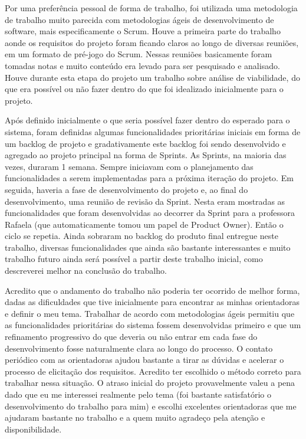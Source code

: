 \documentclass{abnt}
\begin{document}
Por uma preferência pessoal de forma de trabalho, foi utilizada uma metodologia
de trabalho muito parecida com metodologias ágeis de desenvolvimento de software,
mais especificamente o Scrum. Houve a primeira parte do trabalho aonde os requisitos
do projeto foram ficando claros ao longo de diversas reuniões, em um formato de
pré-jogo do Scrum. Nessas reuniões basicamente foram tomadas notas e muito conteúdo
era levado para ser pesquisado e analisado. Houve durante esta etapa do projeto
um trabalho sobre análise de viabilidade, do que era possível ou não fazer dentro
do que foi idealizado inicialmente para o projeto.

Após definido inicialmente o que seria possível fazer dentro do esperado para o
sistema, foram definidas algumas funcionalidades prioritárias iniciais em forma
de um backlog de projeto e gradativamente este backlog foi sendo desenvolvido e
agregado ao projeto principal na forma de Sprints. As Sprints, na maioria das vezes,
duraram 1 semana. Sempre iniciavam com o planejamento das funcionalidades a serem
implementadas para a próxima iteração do projeto. Em seguida, haveria a fase de
desenvolvimento do projeto e, ao final do desenvolvimento, uma reunião de revisão
da Sprint. Nesta eram mostradas as funcionalidades que foram desenvolvidas ao decorrer
da Sprint para a professora Rafaela (que automaticamente tomou um papel de Product
Owner). Então o ciclo se repetia. Ainda sobraram no backlog do produto final entregue
neste trabalho, diversas funcionalidades que ainda são bastante interessantes e muito
trabalho futuro ainda será possível a partir deste trabalho inicial, como descreverei
melhor na conclusão do trabalho.

Acredito que o andamento do trabalho não poderia ter ocorrido de melhor forma, dadas
as dificuldades que tive inicialmente para encontrar as minhas orientadoras e definir
o meu tema. Trabalhar de acordo com metodologias ágeis permitiu que as funcionalidades
prioritárias do sistema fossem desenvolvidas primeiro e que um refinamento progressivo
do que deveria ou não entrar em cada fase do desenvolvimento fosse naturalmente clara
ao longo do processo. O contato periódico com as orientadoras ajudou bastante a
tirar as dúvidas e acelerar o processo de elicitação dos requisitos. Acredito ter
escolhido o método correto para trabalhar nessa situação. O atraso inicial do projeto
provavelmente valeu a pena dado que eu me interessei realmente pelo tema (foi bastante
satisfatório o desenvolvimento do trabalho para mim) e escolhi excelentes orientadoras
que me ajudaram bastante no trabalho e a quem muito agradeço pela atenção e disponibilidade.
\end{document}
